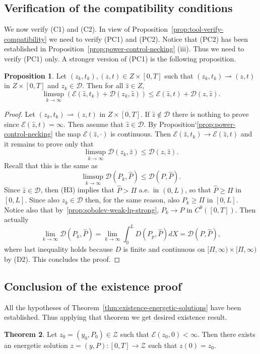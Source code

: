 \documentclass[a4paper,10pt,oneside]{amsbook}
\numberwithin{section}{chapter}
\numberwithin{equation}{chapter}
\theoremstyle{definition}
\newtheorem{prop}{Proposition}[chapter]
\newtheorem{thm}[prop]{Theorem}
\begin{document}
\subsection{Verification of the compatibility conditions}

We now verify (C1) and (C2). In view of Proposition~\ref{prop:tool-verify-compatibility} we need to verify (PC1) and (PC2). Notice that (PC2) has been established in Proposition~\ref{prop:power-control-necking} (iii). Thus we need to verify (PC1) only. A stronger version of (PC1) is the following proposition.
\begin{prop}
Let $(z_k,t_k),(z,t)\in Z\times[0,T]$ such that $(z_k,t_k)\rightharpoonup(z,t)$ in $Z\times[0,T]$ and $z_k\in\mathscr{D}$. Then for all $\hat{z}\in Z$,
\[
\limsup_{k\to\infty}\left(\mathcal{E}(\hat{z},t_k)+\mathcal{D}(z_k,\hat{z})\right)\le\mathcal{E}(\hat{z},t)+\mathcal{D}(z,\hat{z}).
\]
\end{prop}
\begin{proof}
Let $(z_k,t_k)\rightharpoonup (z,t)$ in $Z\times[0,T]$. If $\hat{z}\notin\mathscr{D}$ there is nothing to prove since $\mathcal{E}(\hat{z},t)=\infty$. Then assume that $\hat{z}\in\mathscr{D}$. By Proposition`\eqref{prop:power-control-necking} the map $\mathcal{E}(\hat{z},\cdot)$ is continuous. Then $\mathcal{E}(\hat{z},t_k)\to\mathcal{E}(\hat{z},t)$ and it remains to prove only that
\[
\limsup_{k\to\infty}\mathcal{D}(z_k,\hat{z})\le\mathcal{D}(z,\hat{z}).
\]
Recall that this is the same as
\[
\limsup_{k\to\infty}\mathcal{D}(P_k,\hat{P})\le\mathcal{D}(P,\hat{P}).
\]
Since $\hat{z}\in\mathscr{D}$, then (H3) implies that $\hat{P}>\Pi$ a.e.\ in $(0,L)$, so that $\hat{P}\ge \Pi$ in $[0,L]$. Since also $z_k\in\mathscr{D}$ then, for the same reason, also $P_k\ge \Pi$ in $[0,L]$. Notice also that by~\ref{prop:sobolev-weak-lp-strong}, $P_k\to P$ in $C^0([0,T])$. Then actually
\[
\lim_{k\to\infty}\mathcal{D}(P_k,\hat{P})=\lim_{k\to\infty}\int_0^LD(P_p,\hat{P})dX=\mathcal{D}(P,\hat{P}),
\]
where last inequality holds because $D$ is finite and continuous on $[\Pi,\infty)\times[\Pi,\infty)$ by (D2). This concludes the proof.
\end{proof}

\subsection{Conclusion of the existence proof}

All the hypotheses of Theorem~\ref{thm:existence-energetic-solutions} have been established. Thus applying that theorem we get desired existence result.
\begin{thm}
\label{thm:existence-necking-large}
Let $z_0=(y_0,P_0)\in\mathscr{Z}$ such that $\mathcal{E}(z_0,0)<\infty$. Then there exists an energetic solution $z=(y,P)\colon[0,T]\to\mathscr{Z}$ such that $z(0)=z_0$. 
\end{thm}
\end{document}
